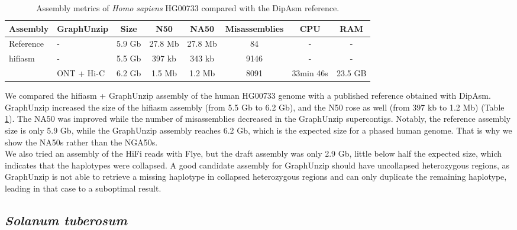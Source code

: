 \begin{table}[ht]
    \begin{center}
    \caption{\label{tab:homo_sapiens_assemblies}Assembly metrics of \textit{Homo sapiens} HG00733 compared with the DipAsm reference.}
    \begin{tabular}{llcccccc}
        \hline
        \textbf{Assembly} & \textbf{GraphUnzip} & \textbf{Size} & \textbf{N50} & \textbf{NA50} & \textbf{Misassemblies} & \textbf{CPU} & \textbf{RAM} \\
        \hline
        Reference & - & 5.9 Gb & 27.8 Mb & 27.8 Mb & 84 & - & - \\
        \hline
        hifiasm & - & 5.5 Gb & 397 kb & 343 kb & 9146 & - & - \\
            & ONT + Hi-C & 6.2 Gb & 1.5 Mb & 1.2 Mb & 8091 & 33min 46s & 23.5 GB \\
        \hline
        \end{tabular}
  \end{center}
\end{table}

We compared the hifiasm + GraphUnzip assembly of the human HG00733 genome with a published reference obtained with DipAsm. GraphUnzip increased the size of the hifiasm assembly (from 5.5 Gb to 6.2 Gb), and the N50 rose as well (from 397 kb to 1.2 Mb) (Table \ref{tab:homo_sapiens_assemblies}). The NA50 was improved while the number of misassemblies decreased in the GraphUnzip supercontigs. Notably, the reference assembly size is only 5.9 Gb, while the GraphUnzip assembly reaches 6.2 Gb, which is the expected size for a phased human genome. That is why we show the NA50s rather than the NGA50s. \\

We also tried an assembly of the HiFi reads with Flye, but the draft assembly was only 2.9 Gb, little below half the expected size, which indicates that the haplotypes were collapsed. A good candidate assembly for GraphUnzip should have uncollapsed heterozygous regions, as GraphUnzip is not able to retrieve a missing haplotype in collapsed heterozygous regions and can only duplicate the remaining haplotype, leading in that case to a suboptimal result.

\subsection{\textit{Solanum tuberosum}}

